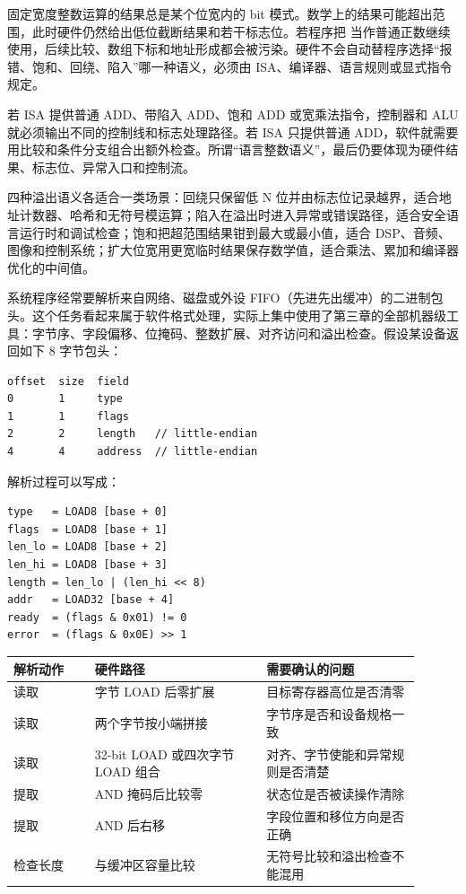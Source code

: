 固定宽度整数运算的结果总是某个位宽内的 bit 模式。数学上的结果可能超出范围，此时硬件仍然给出低位截断结果和若干标志位。若程序把  当作普通正数继续使用，后续比较、数组下标和地址形成都会被污染。硬件不会自动替程序选择“报错、饱和、回绕、陷入”哪一种语义，必须由 ISA、编译器、语言规则或显式指令规定。

若 ISA 提供普通 ADD、带陷入 ADD、饱和 ADD 或宽乘法指令，控制器和 ALU 就必须输出不同的控制线和标志处理路径。若 ISA 只提供普通 ADD，软件就需要用比较和条件分支组合出额外检查。所谓“语言整数语义”，最后仍要体现为硬件结果、标志位、异常入口和控制流。

四种溢出语义各适合一类场景：回绕只保留低 N 位并由标志位记录越界，适合地址计数器、哈希和无符号模运算；陷入在溢出时进入异常或错误路径，适合安全语言运行时和调试检查；饱和把超范围结果钳到最大或最小值，适合 DSP、音频、图像和控制系统；扩大位宽用更宽临时结果保存数学值，适合乘法、累加和编译器优化的中间值。

系统程序经常要解析来自网络、磁盘或外设 FIFO（先进先出缓冲）的二进制包头。这个任务看起来属于软件格式处理，实际上集中使用了第三章的全部机器级工具：字节序、字段偏移、位掩码、整数扩展、对齐访问和溢出检查。假设某设备返回如下 8 字节包头：

\begin{lstlisting}
offset  size  field
0       1     type
1       1     flags
2       2     length   // little-endian
4       4     address  // little-endian
\end{lstlisting}

解析过程可以写成：

\begin{lstlisting}
type   = LOAD8 [base + 0]
flags  = LOAD8 [base + 1]
len_lo = LOAD8 [base + 2]
len_hi = LOAD8 [base + 3]
length = len_lo | (len_hi << 8)
addr   = LOAD32 [base + 4]
ready  = (flags & 0x01) != 0
error  = (flags & 0x0E) >> 1
\end{lstlisting}

\begin{longtable}{L{0.18\linewidth}L{0.38\linewidth}L{0.34\linewidth}}
\toprule
解析动作 & 硬件路径 & 需要确认的问题 \\
\midrule
读取  & 字节 LOAD 后零扩展 & 目标寄存器高位是否清零 \\
读取  & 两个字节按小端拼接 & 字节序是否和设备规格一致 \\
读取  & 32-bit LOAD 或四次字节 LOAD 组合 & 对齐、字节使能和异常规则是否清楚 \\
提取  & AND 掩码后比较零 & 状态位是否被读操作清除 \\
提取  & AND 后右移 & 字段位置和移位方向是否正确 \\
检查长度 & 与缓冲区容量比较 & 无符号比较和溢出检查不能混用 \\
\bottomrule
\end{longtable}


